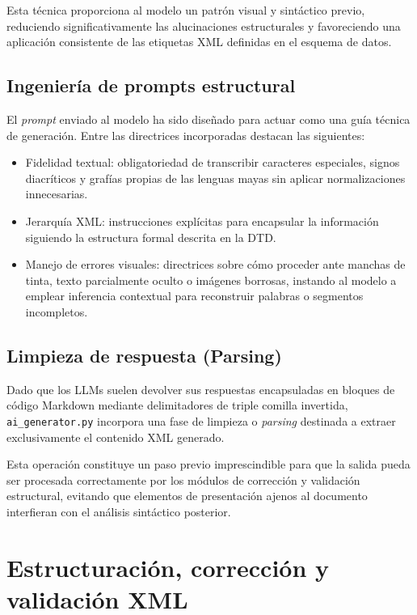 Esta técnica proporciona al modelo un patrón visual y sintáctico previo, reduciendo significativamente las alucinaciones estructurales y favoreciendo una aplicación consistente de las etiquetas XML definidas en el esquema de datos.

\subsection{Ingeniería de prompts estructural}

El \textit{prompt} enviado al modelo ha sido diseñado para actuar como una guía técnica de generación. Entre las directrices incorporadas destacan las siguientes:

\begin{itemize}
    \item Fidelidad textual: obligatoriedad de transcribir caracteres especiales, signos diacríticos y grafías propias de las lenguas mayas sin aplicar normalizaciones innecesarias.

    \item Jerarquía XML: instrucciones explícitas para encapsular la información siguiendo la estructura formal descrita en la DTD.

    \item Manejo de errores visuales: directrices sobre cómo proceder ante manchas de tinta, texto parcialmente oculto o imágenes borrosas, instando al modelo a emplear inferencia contextual para reconstruir palabras o segmentos incompletos.
\end{itemize}

\subsection{Limpieza de respuesta (Parsing)}

Dado que los LLMs suelen devolver sus respuestas encapsuladas en bloques de código Markdown mediante delimitadores de triple comilla invertida, \texttt{ai\_generator.py} incorpora una fase de limpieza o \textit{parsing} destinada a extraer exclusivamente el contenido XML generado.

Esta operación constituye un paso previo imprescindible para que la salida pueda ser procesada correctamente por los módulos de corrección y validación estructural, evitando que elementos de presentación ajenos al documento interfieran con el análisis sintáctico posterior.



\section{Estructuración, corrección y validación XML}

